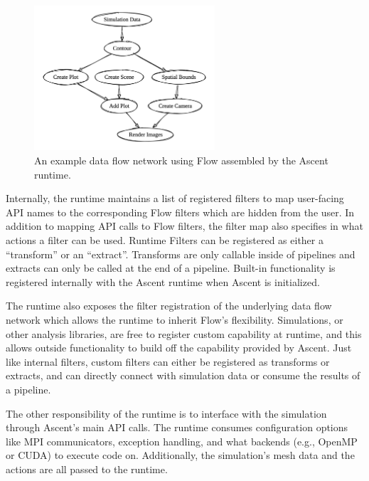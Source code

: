 \begin{figure}
\centering
\includegraphics[width=0.6\textwidth]{images/flow_graph}
\caption{\label{img:flow_graph} An example data flow network using Flow assembled by the Ascent runtime.}
\end{figure}

Internally, the runtime maintains a list of registered filters to map
user-facing API names to the corresponding Flow filters which are hidden
from the user.
%
In addition to mapping API calls to Flow filters, the filter map also specifies
in what actions a filter can be used.
%
Runtime Filters can be registered as either a ``transform'' or an ``extract''.
%
Transforms are only callable inside of pipelines and extracts can only be called at the end of a pipeline.
%
Built-in functionality is registered internally with the Ascent runtime when Ascent is initialized.


The runtime also exposes the filter registration of the underlying data flow network which
allows the runtime to inherit Flow's flexibility.
%
Simulations, or other analysis libraries, are free to register custom capability at
runtime, and this allows outside functionality to build off the capability
provided by Ascent.
%
Just like internal filters, custom filters can either be registered as transforms or extracts,
and can directly connect with simulation data or consume the results of a pipeline.
%

The other responsibility of the runtime is to interface with the simulation through Ascent's
main API calls.
%
The runtime consumes configuration options like MPI communicators, exception
handling, and what
backends (e.g., OpenMP or CUDA) to execute code on.
%
Additionally, the simulation's mesh data and the actions are all passed to the runtime.

